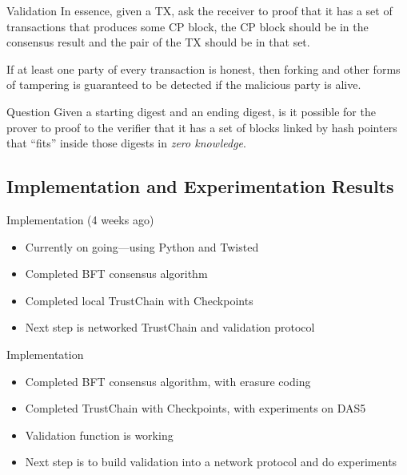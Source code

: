 \documentclass{beamer}
\begin{document}
\begin{frame}{Validation}
  In essence, given a TX, ask the receiver to proof that it has a set of
  transactions that produces some CP block, the CP block should be in the
  consensus result and the pair of the TX should be in that set.

  \begin{theorem}
    If at least one party of every transaction is honest, then forking and other
    forms of tampering is guaranteed to be detected if the malicious party is
    alive.
  \end{theorem}

  \begin{block}{Question}
    Given a starting digest and an ending digest, is it possible for the prover
    to proof to the verifier that it has a set of blocks linked by hash pointers
    that ``fits'' inside those digests in \emph{zero knowledge}.
  \end{block}
\end{frame}

\subsection{Implementation and Experimentation Results}
\begin{frame}{Implementation (4 weeks ago)}
  \begin{itemize}
    \item Currently on going---using Python and Twisted
    \item Completed BFT consensus algorithm
    \item Completed local TrustChain with Checkpoints
    \item Next step is networked TrustChain and validation protocol
  \end{itemize}
\end{frame}

\begin{frame}{Implementation}
  \begin{itemize}
    \item Completed BFT consensus algorithm, with erasure coding
    \item Completed TrustChain with Checkpoints, with experiments on DAS5
    \item Validation function is working
    \item Next step is to build validation into a network protocol and do experiments
  \end{itemize}
\end{frame}
\end{document}
